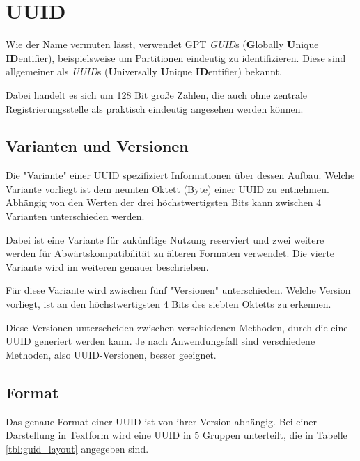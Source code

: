 \section{UUID}

Wie der Name vermuten lässt, verwendet GPT \textit{GUID}s (\textbf{G}lobally \textbf{U}nique \textbf{ID}entifier), beispielsweise um Partitionen eindeutig zu identifizieren.
Diese sind allgemeiner als \textit{UUID}s (\textbf{U}niversally \textbf{U}nique \textbf{ID}entifier) bekannt. 

Dabei handelt es sich um 128 Bit große Zahlen, die auch ohne zentrale Registrierungsstelle als praktisch eindeutig angesehen werden können.

\subsection{Varianten und Versionen}
\label{sec:guid:variants}

Die "Variante" einer UUID spezifiziert Informationen über dessen Aufbau.
Welche Variante vorliegt ist dem neunten Oktett (Byte) einer UUID zu entnehmen.
Abhängig von den Werten der drei höchstwertigsten Bits kann zwischen 4 Varianten unterschieden werden.

Dabei ist eine Variante für zukünftige Nutzung reserviert und zwei weitere werden für Abwärtskompatibilität zu älteren Formaten verwendet. 
Die vierte Variante wird im weiteren genauer beschrieben.

Für diese Variante wird zwischen fünf "Versionen" unterschieden.
Welche Version vorliegt, ist an den höchstwertigsten 4 Bits des siebten Oktetts zu erkennen.

Diese Versionen unterscheiden zwischen verschiedenen Methoden, durch die eine UUID generiert werden kann.
Je nach Anwendungsfall sind verschiedene Methoden, also UUID-Versionen, besser geeignet.


\subsection{Format}
\label{sec:guid:format}

Das genaue Format einer UUID ist von ihrer Version abhängig.
Bei einer Darstellung in Textform wird eine UUID in 5 Gruppen unterteilt, die in Tabelle \ref{tbl:guid_layout} angegeben sind.

